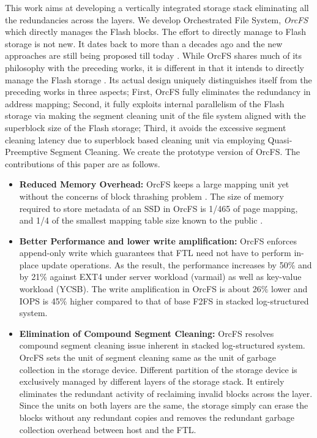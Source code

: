 \documentclass[prodmode,acmtecs]{acmsmall}
\begin{document}
This work aims at developing a vertically integrated storage stack
eliminating all the redundancies across the layers. We develop
Orchestrated File System, \emph{OrcFS} which directly manages the Flash
blocks. The effort to directly manage to Flash storage is not new. It
dates back to more than a decades ago \cite{woodhouse2001jffs,manning2010yaffs} 
and the new approaches are still being proposed
till today \cite{nvmkv,sdf,anvil,zhangremoving,lee2016application,zhang2016parafs}.
While OrcFS shares much of its philosophy with
the preceding works, it is different in that it intends to directly manage the Flash
storage \cite{lee2016application,zhang2016parafs}. Its actual design
uniquely distinguishes itself from the preceding works in three
aspects; First, OrcFS fully eliminates the redundancy in address
mapping; Second, it fully exploits internal parallelism of the Flash
storage via making the segment cleaning unit of the file system aligned
with the superblock size of the Flash storage; Third, it avoids the
excessive segment cleaning latency due to superblock based cleaning
unit via employing Quasi-Preemptive Segment Cleaning.  We create the prototype
version of OrcFS.  The contributions of this paper are as follows.

\begin{itemize} 
\item {\bf Reduced Memory Overhead:} OrcFS keeps a large mapping unit
  yet without the concerns of block thrashing problem \cite{fast07}. The size of
  memory required to store metadata of an SSD in OrcFS is 1/465 of page
  mapping, and 1/4 of the smallest mapping table size known to the
  public \cite{lee2016application}.

\item {\bf Better Performance and lower write amplification:} OrcFS
enforces append-only write which 
  guarantees that FTL need not have to perform in-place update operations. As the result, the
  performance increases by 50\% and by 21\% against EXT4 under server
  workload (varmail) as well as key-value workload (YCSB).  The write
  amplification in OrcFS is about 26$\%$ lower and IOPS is 45$\%$
  higher compared to that of base F2FS in stacked log-structured
  system.

\item {\bf Elimination of Compound Segment Cleaning:} OrcFS resolves
  compound segment cleaning issue inherent in stacked log-structured
  system. OrcFS sets the unit of segment cleaning same as the unit of
  garbage collection in the storage device. Different partition of the
  storage device is exclusively managed by different layers of the
  storage stack. It entirely eliminates the redundant activity of
  reclaiming invalid blocks across the layer. Since the units on both
  layers are the same, the storage simply can erase the blocks without
  any redundant copies and removes the redundant garbage collection
  overhead between host and the FTL.
\end{itemize}
\end{document}

